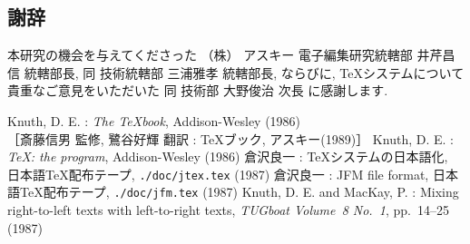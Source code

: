 \subsection*{謝辞}

本研究の機会を与えてくださった
（株）\kern-3pt アスキー 電子編集研究統轄部 井芹昌信 統轄部長,
同 技術統轄部 三浦雅孝 統轄部長,
ならびに, \TeX システムについて貴重なご意見をいただいた 同 技術部 大野俊治 次長
に感謝します.

\begin{thebibliography}{9}
 Knuth, D. E. : {\em The \TeX book}, Addison-Wesley (1986)\\
	［斎藤信男 監修, 鷺谷好輝 翻訳 : \TeX ブック, アスキー(1989)］
 Knuth, D. E. : {\em \TeX : the program}, Addison-Wesley (1986)
 倉沢良一 : \TeX システムの日本語化,
		日本語\TeX 配布テープ, {\tt ./doc/jtex.tex} (1987)
 倉沢良一 : JFM file format,
		日本語\TeX 配布テープ, {\tt ./doc/jfm.tex} (1987)
 Knuth, D. E. and MacKay, P. :
	Mixing right-to-left texts with left-to-right texts,
		{\em TUGboat Volume~8 No.~1}, pp.~14--25 (1987)
\end{thebibliography}


